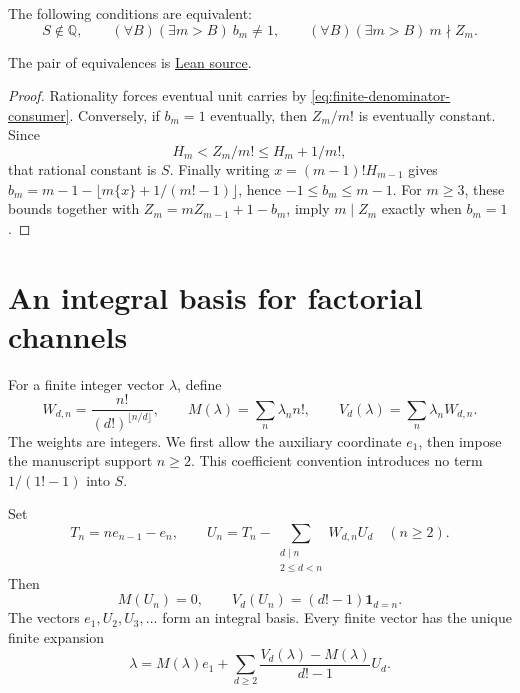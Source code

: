 \documentclass[11pt]{article}
\begin{document}
\begin{theorem}
\label{res:carry-characterization}\label{res:strict-successor-complete-characterization}
The following conditions are equivalent:
\[
S\notin\mathbb Q,\qquad
(\forall B)(\exists m>B)\ b_m\ne1,\qquad
(\forall B)(\exists m>B)\ m\nmid Z_m.
\]
\end{theorem}

\noindent The pair of equivalences is
\href{https://github.com/wcook04/plectis-erdos/blob/f36a98bf3d3e6f65f1074e3b800e3293d5b8a51a/ErdosProblems/Erdos68/PaperCompleteExisting.lean#L47}{Lean source}.
\begin{proof}
Rationality forces eventual unit carries by
\eqref{eq:finite-denominator-consumer}.  Conversely, if $b_m=1$
eventually, then $Z_m/m!$ is eventually constant.  Since
\[
H_m<Z_m/m!\le H_m+1/m!,
\]
that rational constant is $S$.  Finally writing $x=(m-1)!H_{m-1}$ gives
$b_m=m-1-\lfloor m\{x\}+1/(m!-1)\rfloor$, hence
$-1\le b_m\le m-1$.  For $m\ge3$, these bounds together with
$Z_m=mZ_{m-1}+1-b_m$, imply $m\mid Z_m$ exactly when $b_m=1$.
\end{proof}

\section{An integral basis for factorial channels}\label{sec:channels}

For a finite integer vector $\lambda$, define
\[
W_{d,n}=\frac{n!}{(d!)^{\lfloor n/d\rfloor}},\qquad
M(\lambda)=\sum_n\lambda_n n!,\qquad
V_d(\lambda)=\sum_n\lambda_nW_{d,n}.
\]
The weights are integers.  We first allow the auxiliary coordinate $e_1$,
then impose the manuscript support $n\ge2$.  This coefficient convention
introduces no term $1/(1!-1)$ into $S$.

\begin{theorem}\label{res:divisor-channel-coordinates}
Set
\[
T_n=ne_{n-1}-e_n,\qquad
U_n=T_n-\sum_{\substack{d\mid n\\2\le d<n}}W_{d,n}U_d
\quad(n\ge2).
\]
Then
\[
M(U_n)=0,\qquad V_d(U_n)=(d!-1)\mathbf1_{d=n}.
\]
The vectors $e_1,U_2,U_3,\ldots$ form an integral basis.  Every finite vector
has the unique finite expansion
\begin{equation}
\lambda=M(\lambda)e_1+
\sum_{d\ge2}\frac{V_d(\lambda)-M(\lambda)}{d!-1}U_d.
\label{eq:channel-basis-expansion}
\end{equation}
\end{theorem}
\end{document}
